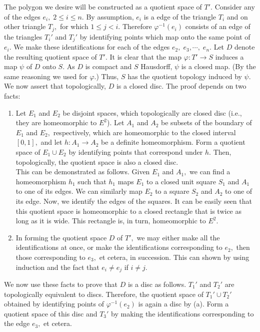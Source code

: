 \documentclass{article}
\theoremstyle{definition}
\begin{document}
The polygon we desire will be constructed as a quotient space of $T'.$ Consider any of the edges $e_i,\;2\le i \le n.$ By assumption, $e_i$ is a edge of the triangle $T_i$ and on other triangle $T_j,$ for which $1 \le j < i.$ Therefore $\varphi^{-1}(e_i)$ consists of an edge of the triangles $T_i'$ and $T_j'$ by identifying points which map onto the same point of $e_i.$ We make these identifications for each of the edges $e_2,\;e_3,\cdots,\;e_n.$ Let $D$ denote the resulting quotient space of $T'.$ It is clear that the map $\varphi:T' \longrightarrow S$ induces a map $\psi$ of $D$ onto $S.$ As $D$ is compact and $S$ Hausdorff, $\psi$ is a closed map. (By the same reasoning we used for $\varphi$.) Thus, $S$ has the quotient topology induced by $\psi.$\\
We now assert that topologically, $D$ is a closed disc. The proof depends on two facts:
\begin{enumerate}[label = (\alph*)] 
  \item Let $E_1$ and $E_2$ be disjoint spaces, which topologically are closed disc (i.e., they are homeomorphic to $E^2$). Let $A_1$ and $A_2$ be subsets of the boundary of $E_1$ and $E_2,$ respectively, which are homeomorphic to the closed interval $[0, 1],$ and let $h:A_1 \longrightarrow A_2$ be a definite homeomorphism. Form a quotient space of $E_1 \cup E_2$ by identifying points that correspond under $h.$ Then, topologically, the quotient space is also a closed disc.\\
  This can be demonstrated as follows. Given $E_1$ and $A_1,$ we can find a homeomorphism $h_1$ such that $h_1$ maps $E_1$ to a closed unit square $S_1$ and $A_1$ to one of its edges. We can similarly map $E_2$ to a square $S_2$ and $A_2$ to one of its edge. Now, we identify the edges of the squares. It can be easily seen that this quotient space is homeomorphic to a closed rectangle that is twice as long as it is wide. This rectangle is, in turn, homeomorphic to $E^2.$
  \item  In forming the quotient space $D$ of $T',$ we may either make all the identifications at once, or make the identifications corresponding to $e_2,$ then those corresponding to $e_3,$ et cetera, in succession. This can shown by using induction and the fact that $e_i \neq e_j$ if $i \neq j.$
\end{enumerate}
We now use these facts to prove that $D$ is a disc as follows. $T_1'$ and $T_2'$ are topologically equivalent to discs. Therefore, the quotient space of $T_1' \cup T_2'$ obtained by identifying points of $\varphi^{-1}(e_2)$ is again a disc by (a). Form a quotient space of this disc and $T_3'$ by making the identifications corresponding to the edge $e_3,$ et cetera.\\
\end{document}
